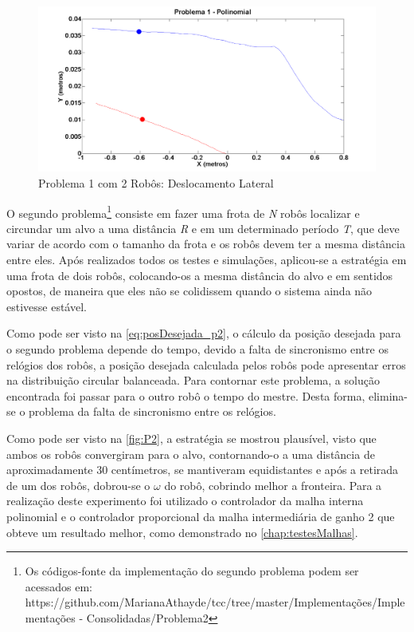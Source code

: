 \begin{figure}[!htb]
		\centering
		\includegraphics[width=.9\linewidth]{./Testes/Problema1/Incremental/P1Depois}
	\caption{Problema 1 com 2 Robôs: Deslocamento Lateral}
	\label{fig:sP13}
\end{figure}

O segundo problema\footnote{Os códigos-fonte da implementação do segundo problema podem ser acessados em: https://github.com/MarianaAthayde/tcc/tree/master/Implementações/Implementações - Consolidadas/Problema2} consiste em fazer uma frota de \emph{N} robôs localizar e circundar um alvo a uma distância \emph{R} e em um determinado período \emph{T}, que deve variar de acordo com o tamanho da frota e os robôs devem ter a mesma distância entre eles. Após realizados todos os testes e simulações, aplicou-se a estratégia em uma frota de dois robôs, colocando-os a mesma distância do alvo e em sentidos opostos, de maneira que eles não se colidissem quando o sistema ainda não estivesse estável. 

Como pode ser visto na \autoref{eq:posDesejada_p2}, o cálculo da posição desejada para o segundo problema depende do tempo, devido a falta de sincronismo entre os relógios dos robôs, a posição desejada calculada pelos robôs pode apresentar erros na distribuição circular balanceada. Para contornar este problema, a solução encontrada foi passar para o outro robô o tempo do mestre. Desta forma, elimina-se o problema da falta de sincronismo entre os relógios. 

Como pode ser visto na \autoref{fig:P2}, a estratégia se mostrou plausível, visto que ambos os robôs convergiram para o alvo, contornando-o a uma distância de aproximadamente 30 centímetros, se mantiveram equidistantes e após a retirada de um dos robôs, %
dobrou-se o $\omega$ do robô, cobrindo melhor a fronteira. Para a realização deste experimento foi utilizado o controlador da malha interna polinomial e o controlador proporcional da malha intermediária de ganho 2 que obteve um resultado melhor, como demonstrado no \autoref{chap:testesMalhas}.

